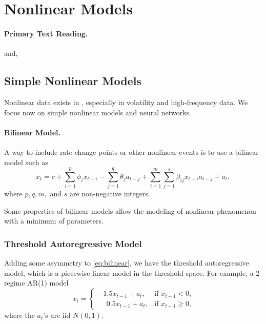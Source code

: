 \section{Nonlinear Models}
\paragraph{Primary Text Reading.}  and, 
\subsection{Simple Nonlinear Models}

Nonlinear data exists in \fts{}, especially in volatility and high-frequency data. We focus now on simple nonlinear models and neural networks. 

\paragraph{Bilinear Model.} A way to include rate-change points or other nonlinear events is to use a bilinear model such as
\begin{equation}
x_t = c+ \sum^p_{i=1} \phi_i x_{t-i} - \sum^q_{j=1} \theta_j a_{t-j} + \sum^m_{i=1} \sum^s_{j=1} \beta_{ij} x_{t-i} a_{t-j} + a_t,
\label{eq:bilinear}
\end{equation}
where $p,q,m,$ and $s$ are non-negative integers.

Some properties of bilinear models allow the modeling of nonlinear phenomenon with a minimum of parameters. 

\subsubsection{Threshold Autoregressive Model}\label{tar-model} Adding some asymmetry to \eqref{eq:bilinear}, we have the threshold autoregressive model, which is a piecewise linear model in the threshold space. For example, a 2-regime AR(1) model 
\[
x_t =
\begin{cases}
-1.5x_{t-1} + a_t, &\text{if $x_{t-1}<0$,} \\
\phantom{-}0.5x_{t-1} + a_t, &\text{if $x_{t-1} \ge 0$,}
\end{cases}
\]
where the $a_{t}$'s are iid $N(0, 1)$. 


